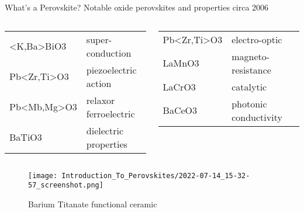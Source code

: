 \documentclass[10pt, aspectratio=169, presentation]{beamer}
\begin{document}
\begin{frame}[label={sec:orgfb151e0}]{What's a Perovskite?}
Notable oxide perovskites and properties circa 2006
\autocite{jiang-2006-predic-lattic}
\begin{columns}
\begin{column}{0.5\columnwidth}
\small
\begin{center}
\begin{tabular}{ll}
<K,Ba>BiO3 & super-conduction\\[0pt]
Pb<Zr,Ti>O3 & piezoelectric action\\[0pt]
Pb<Mb,Mg>O3 & relaxor ferroelectric\\[0pt]
BaTiO3 & dielectric properties\\[0pt]
\end{tabular}
\end{center}
\end{column}
\begin{column}{0.5\columnwidth}
\small
\begin{center}
\begin{tabular}{ll}
Pb<Zr,Ti>O3 & electro-optic\\[0pt]
LaMnO3 & magneto-resistance\\[0pt]
LaCrO3 & catalytic\\[0pt]
BaCeO3 & photonic conductivity\\[0pt]
\end{tabular}
\end{center}
\end{column}
\end{columns}
\begin{figure}[htbp]
\centering
\texttt{[image: Introduction\_To\_Perovskites/2022-07-14\_15-32-57\_screenshot.png]}
\caption{Barium Titanate functional ceramic}
\end{figure}
\end{frame}
\end{document}
